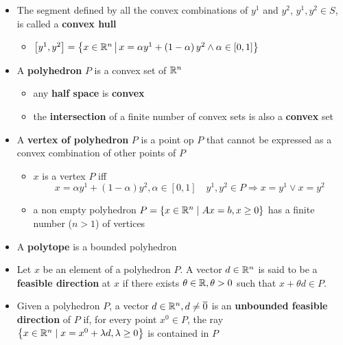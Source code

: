 \documentclass[english]{article}
\begin{document}
\begin{itemize}
\begin{itemize}[label=\(\rightarrow\)]
        \end{itemize}
  \item The segment defined by all the convex combinations of \(y^1\) and \(y^2\), \(y^1, y^2 \in S\), is called a \textbf{convex hull}
        \begin{itemize}[label=\(\rightarrow\)]
          \item \(\left[ y^1, y^2 \right] = \left\{ x \in \mathbb{R}^n \,\middle\vert\,   x = \alpha y^1 + \left( 1-\alpha \right) y^2 \land \alpha \in \left[ 0, 1 \right] \right\}\)
        \end{itemize}
  \item A \textbf{polyhedron} \(P\) is a convex set of \(\mathbb{R}^n\)
        \begin{itemize}
          \item any \textbf{half space} is \textbf{convex}
          \item the \textbf{intersection} of a finite number of convex sets is also a \textbf{convex} set
        \end{itemize}
  \item A \textbf{vertex of polyhedron} \(P\) is a point op \(P\) that cannot be expressed as a convex combination of other points of \(P\)
        \begin{itemize}
          \item \(x\) is a vertex \(P\) iff
                \[ x = \alpha y^1 + (1 - \alpha) y^2, \alpha \in \left[ 0, 1 \right] \quad y^1, y^2 \in P \Rightarrow x = y^1 \lor x = y^2 \]
          \item a non empty polyhedron \(P = \left\{ x \in \mathbb{R}^n \mid  Ax = b, x \geq 0 \right\}\) has a finite number (\(n >1\)) of vertices
        \end{itemize}
  \item A \textbf{polytope} is a bounded polyhedron
  \item Let \(x\) be an element of a polyhedron \(P\). A vector \(d \in \mathbb{R}^n\) is said to be a \textbf{feasible direction} at \(x\) if there exists \(\theta \in \mathbb{R}, \theta > 0\) such that \(x + \theta d \in P\).
  \item Given a polyhedron \(P\), a vector \(d \in \mathbb{R}^n, d \neq \overline{0}\) is an \textbf{unbounded feasible direction} of \(P\) if, for every point \(x^0 \in P\), the ray \(\left\{ x \in \mathbb{R}^n \mid   x = x^0 + \lambda d, \lambda \geq 0 \right\}\) is contained in \(P\)
\end{itemize}
\end{document}
